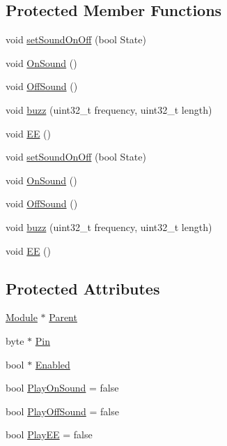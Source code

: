 \subsection*{Protected Member Functions}
\begin{DoxyCompactItemize}
\item 
void \hyperlink{class_sound_a6917e650a721b0e7fc6d998edf6a3cf7}{set\+Sound\+On\+Off} (bool State)
\item 
void \hyperlink{class_sound_ac26eda99f623e5a839d1c408d8a591d9}{On\+Sound} ()
\item 
void \hyperlink{class_sound_ab1fb7a2e72d848ca335b4721cd8540b7}{Off\+Sound} ()
\item 
void \hyperlink{class_sound_a3d0f7b044cff8851a335bb9c4fb78542}{buzz} (uint32\+\_\+t frequency, uint32\+\_\+t length)
\item 
void \hyperlink{class_sound_a8b4af7ef38cf7e66c6dea94d10a9b229}{EE} ()
\item 
void \hyperlink{class_sound_a6917e650a721b0e7fc6d998edf6a3cf7}{set\+Sound\+On\+Off} (bool State)
\item 
void \hyperlink{class_sound_ac26eda99f623e5a839d1c408d8a591d9}{On\+Sound} ()
\item 
void \hyperlink{class_sound_ab1fb7a2e72d848ca335b4721cd8540b7}{Off\+Sound} ()
\item 
void \hyperlink{class_sound_a3d0f7b044cff8851a335bb9c4fb78542}{buzz} (uint32\+\_\+t frequency, uint32\+\_\+t length)
\item 
void \hyperlink{class_sound_a8b4af7ef38cf7e66c6dea94d10a9b229}{EE} ()
\end{DoxyCompactItemize}
\subsection*{Protected Attributes}
\begin{DoxyCompactItemize}
\item 
\hyperlink{class_module}{Module} $\ast$ \hyperlink{class_sound_a34e48159f12d4431e962d80fad71eb02}{Parent}
\item 
byte $\ast$ \hyperlink{class_sound_a2a57d6464d4edef8b652d3b9602de07e}{Pin}
\item 
bool $\ast$ \hyperlink{class_sound_afd4cd9f0db67980b0af5c8c6ed1c3b76}{Enabled}
\item 
bool \hyperlink{class_sound_a2e4c00d9fc63a08a193a741fffe896ca}{Play\+On\+Sound} = false
\item 
bool \hyperlink{class_sound_a02a8c493337336014ba0395bdae5c4a8}{Play\+Off\+Sound} = false
\item 
bool \hyperlink{class_sound_ac7a3280d002f67188a199829e089f5f4}{Play\+EE} = false
\end{DoxyCompactItemize}
